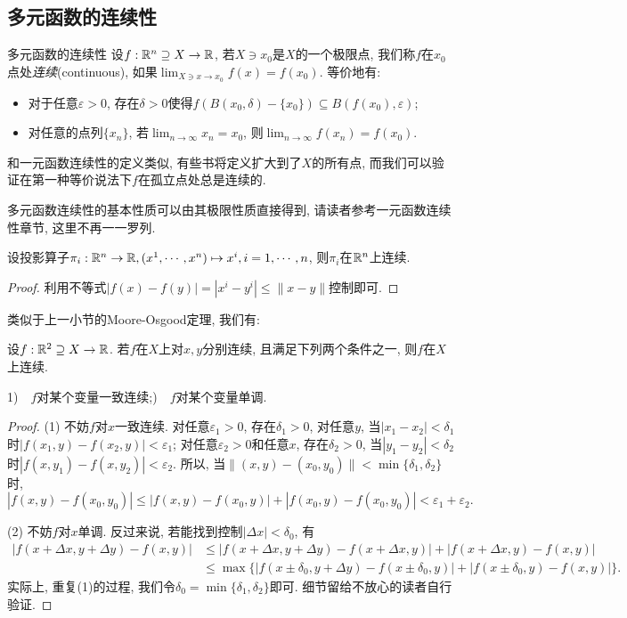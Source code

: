 \subsection{多元函数的连续性}

\begin{definition}{多元函数的连续性}
	设$f:\mathbb{R} ^n \supseteq X \to \mathbb{R}$, 若$X \ni x_0$是$X$的一个极限点, 我们称$f$在$x_0$点处\textit{连续}(continuous), 如果$\lim_{X \ni x \to x_0} f(x) = f(x_0)$. 等价地有: 
	\begin{itemize}
		\item 对于任意$\varepsilon >0$, 存在$\delta >0$使得$f(B(x_0,\delta) - \{ x_0 \}) \subseteq B(f(x_0),\varepsilon)$; 
		\item 对任意的点列$\{ x_n \}$, 若$\lim_{n \to \infty} x_n = x_0$, 则$\lim_{n \to \infty} f(x_n) = f(x_0)$. 
	\end{itemize}
\end{definition}
\begin{remark}
	和一元函数连续性的定义类似, 有些书将定义扩大到了$X$的所有点, 而我们可以验证在第一种等价说法下$f$在孤立点处总是连续的. 
\end{remark}

多元函数连续性的基本性质可以由其极限性质直接得到, 请读者参考一元函数连续性章节, 这里不再一一罗列. 

\begin{example}
	设投影算子$\pi _i :\mathbb{R} ^n \to \mathbb{R} ,(x^1,\cdots ,x^n) \mapsto x^i,i=1,\cdots ,n$, 则$\pi _i$在$\mathbb{R} ^n$上连续. 
\end{example}
\begin{proof}
	利用不等式$|f(x)-f(y)|=|x^i - y^i| \leq \| x-y \|$控制即可. 
\end{proof}

类似于上一小节的Moore-Osgood定理, 我们有: 

\begin{proposition}{}
	设$f:\mathbb{R} ^2 \supseteq X \to \mathbb{R}$. 若$f$在$X$上对$x,y$分别连续, 且满足下列两个条件之一, 则$f$在$X$上连续. 
	
	1)~~$f$对某个变量一致连续;)~~$f$对某个变量单调. 
\end{proposition}
\begin{proof}
	(1) 不妨$f$对$x$一致连续. 对任意$\varepsilon _1>0$, 存在$\delta _1 >0$, 对任意$y$, 当$|x_1-x_2|<\delta _1$时$|f(x_1,y)-f(x_2,y)|<\varepsilon _1$; 对任意$\varepsilon _2>0$和任意$x$, 存在$\delta _2 >0$, 当$|y_1-y_2|<\delta _2$时$|f(x,y_1)-f(x,y_2)|<\varepsilon _2$. 所以, 当$\| (x,y)-(x_0,y_0) \|<\min \{ \delta _1,\delta _2 \}$时, $$|f(x,y)-f(x_0,y_0)| \leq |f(x,y)-f(x_0,y)| + |f(x_0,y)-f(x_0,y_0)| < \varepsilon _1 + \varepsilon _2. $$
	
	(2) 不妨$f$对$x$单调. 反过来说, 若能找到控制$|\Delta x| < \delta _0$, 有
	\begin{align*}
		|f(x+\Delta x,y+\Delta y)-f(x,y)| &\leq |f(x+\Delta x,y+\Delta y) - f(x+\Delta x,y)| + |f(x+\Delta x,y) - f(x,y)|  \\
		&\leq \max \{ |f(x \pm \delta _0 , y+\Delta y) - f(x \pm \delta _0 , y)| + |f(x \pm \delta _0 , y) - f(x,y)| \}.
	\end{align*}
	实际上, 重复(1)的过程, 我们令$\delta _0 = \min \{ \delta _1,\delta _2 \}$即可. 细节留给不放心的读者自行验证. 
\end{proof}

